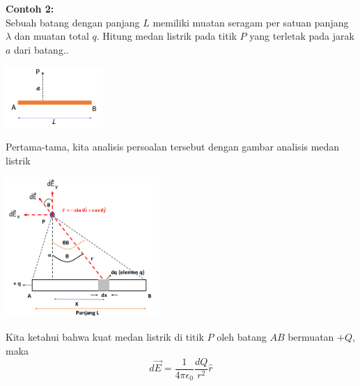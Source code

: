\documentclass[twocolumn, 11pt]{article}%
\begin{document}
    \textbf{Contoh 2:}\\ 
    Sebuah batang dengan panjang $L$ memiliki muatan seragam per satuan panjang $\lambda$ dan muatan total $q$. Hitung medan listrik pada titik $P$ yang terletak pada jarak $a$ dari batang..
    \begin{center}
        \includegraphics[width=140px]{9.png}
    \end{center}

    Pertama-tama, kita analisis persoalan tersebut dengan gambar analisis medan listrik
    \begin{center}
        \includegraphics[width=220px]{10.png}
    \end{center}
    Kita ketahui bahwa kuat medan listrik di titik $P$ oleh batang $AB$ bermuatan $+Q$, maka
    \[ d\vec E = \frac1{4\pi \epsilon_0} \frac{dQ}{r^2} \hat r \]
\end{document}
